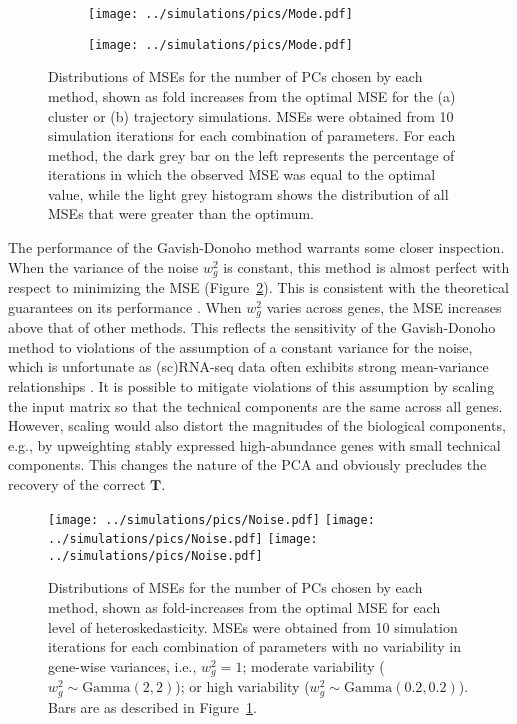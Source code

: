 \documentclass[10pt,letterpaper]{article}
\begin{document}
\begin{figure}
\centering
\begin{subfigure}[b]{0.49\textwidth}
    \texttt{[image: ../simulations/pics/Mode.pdf]}
    \caption{}
\end{subfigure}
\begin{subfigure}[b]{0.49\textwidth}
    \texttt{[image: ../simulations/pics/Mode.pdf]}
    \caption{}
\end{subfigure}
\caption{Distributions of MSEs for the number of PCs chosen by each method, shown as fold increases from the optimal MSE for the (a) cluster or (b) trajectory simulations.
MSEs were obtained from 10 simulation iterations for each combination of parameters.
For each method, the dark grey bar on the left represents the percentage of iterations in which the observed MSE was equal to the optimal value,
while the light grey histogram shows the distribution of all MSEs that were greater than the optimum.}
\label{fig:all}
\end{figure}

The performance of the Gavish-Donoho method warrants some closer inspection.
When the variance of the noise $w^2_g$ is constant, this method is almost perfect with respect to minimizing the MSE (Figure~\ref{fig:noise}).
This is consistent with the theoretical guarantees on its performance \cite{gavish2014optimal}.
When $w^2_g$ varies across genes, the MSE increases above that of other methods.
This reflects the sensitivity of the Gavish-Donoho method to violations of the assumption of a constant variance for the noise,
which is unfortunate as (sc)RNA-seq data often exhibits strong mean-variance relationships \cite{lun2016stepbystep,law2014voom}. 
It is possible to mitigate violations of this assumption by scaling the input matrix so that the technical components are the same across all genes.
However, scaling would also distort the magnitudes of the biological components, e.g., by upweighting stably expressed high-abundance genes with small technical components.
This changes the nature of the PCA and obviously precludes the recovery of the correct $\mathbf{T}$.

\begin{figure}
\begin{center}
    \texttt{[image: ../simulations/pics/Noise.pdf]}
    \texttt{[image: ../simulations/pics/Noise.pdf]}
    \texttt{[image: ../simulations/pics/Noise.pdf]}
\end{center}
\caption{Distributions of MSEs for the number of PCs chosen by each method, shown as fold-increases from the optimal MSE for each level of heteroskedasticity.
MSEs were obtained from 10 simulation iterations for each combination of parameters with 
no variability in gene-wise variances, i.e., $w_g^2=1$;
moderate variability ($w_g^2 \sim \mbox{Gamma}(2, 2)$);
or high variability ($w_g^2 \sim \mbox{Gamma}(0.2, 0.2)$).
Bars are as described in Figure~\ref{fig:all}.    
}
\label{fig:noise}
\end{figure}
\end{document}
